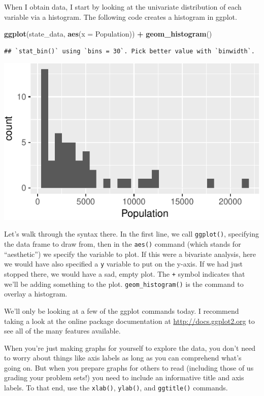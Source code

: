 \documentclass[12pt,oneside,openany]{book}
\newenvironment{Shaded}{\begin{snugshade}}{\end{snugshade}}
\newcommand{\KeywordTok}[1]{\textcolor[rgb]{0.13,0.29,0.53}{\textbf{#1}}}
\newcommand{\DataTypeTok}[1]{\textcolor[rgb]{0.13,0.29,0.53}{#1}}
\newcommand{\StringTok}[1]{\textcolor[rgb]{0.31,0.60,0.02}{#1}}
\newcommand{\OperatorTok}[1]{\textcolor[rgb]{0.81,0.36,0.00}{\textbf{#1}}}
\newcommand{\NormalTok}[1]{#1}
\begin{document}
When I obtain data, I start by looking at the univariate distribution of
each variable via a histogram. The following code creates a histogram in
ggplot.

\begin{Shaded}
\begin{Highlighting}[]
\KeywordTok{ggplot}\NormalTok{(state_data, }\KeywordTok{aes}\NormalTok{(}\DataTypeTok{x =}\NormalTok{ Population)) }\OperatorTok{+}
\StringTok{  }\KeywordTok{geom_histogram}\NormalTok{()}
\end{Highlighting}
\end{Shaded}

\begin{verbatim}
## `stat_bin()` using `bins = 30`. Pick better value with `binwidth`.
\end{verbatim}

\includegraphics{pdaps_files/figure-latex/histogram-1.pdf}

Let's walk through the syntax there. In the first line, we call
\texttt{ggplot()}, specifying the data frame to draw from, then in the
\texttt{aes()} command (which stands for ``aesthetic'') we specify the
variable to plot. If this were a bivariate analysis, here we would have
also specified a \texttt{y} variable to put on the y-axis. If we had
just stopped there, we would have a sad, empty plot. The \texttt{+}
symbol indicates that we'll be adding something to the plot.
\texttt{geom\_histogram()} is the command to overlay a histogram.

We'll only be looking at a few of the ggplot commands today. I recommend
taking a look at the online package documentation at
\url{http://docs.ggplot2.org} to see all of the many features available.

When you're just making graphs for yourself to explore the data, you
don't need to worry about things like axis labels as long as you can
comprehend what's going on. But when you prepare graphs for others to
read (including those of us grading your problem sets!) you need to
include an informative title and axis labels. To that end, use the
\texttt{xlab()}, \texttt{ylab()}, and \texttt{ggtitle()} commands.
\end{document}
